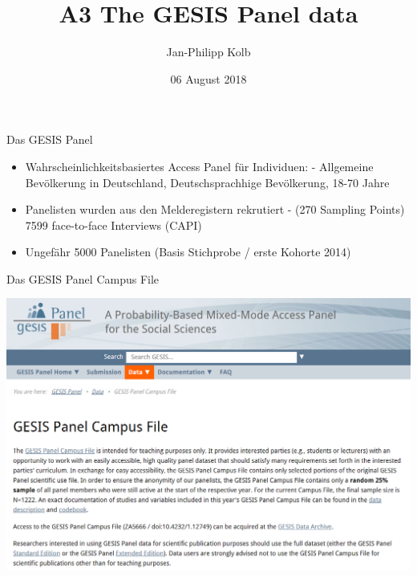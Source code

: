 \documentclass[ignorenonframetext,]{beamer}
\title{A3 The GESIS Panel data}
\author{Jan-Philipp Kolb}
\date{06 August 2018}
\providecommand{\tightlist}{%
  \setlength{\itemsep}{0pt}\setlength{\parskip}{0pt}}
\begin{document}
\frame{\titlepage}

\begin{frame}{Das GESIS Panel}

\begin{itemize}
\tightlist
\item
  Wahrscheinlichkeitsbasiertes Access Panel für Individuen: - Allgemeine
  Bevölkerung in Deutschland, Deutschsprachhige Bevölkerung, 18-70 Jahre
\item
  Panelisten wurden aus den Melderegistern rekrutiert - (270 Sampling
  Points) 7599 face-to-face Interviews (CAPI)
\item
  Ungefähr 5000 Panelisten (Basis Stichprobe / erste Kohorte 2014)
\end{itemize}

\end{frame}

\begin{frame}{Das GESIS Panel Campus File}

\includegraphics{figure/gpdata.PNG}

\end{frame}
\end{document}
